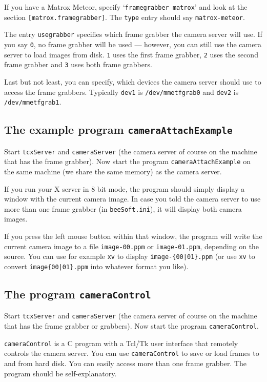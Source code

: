 \documentclass{article}
\begin{document}
If you have a Matrox Meteor, specify `\texttt{framegrabber matrox}' and look
at the section \texttt{[matrox.framegrabber]}. The \texttt{type} entry should
say \texttt{matrox-meteor}.

The entry \texttt{usegrabber} specifies which frame grabber the camera server
will use. If you say \texttt{0}, no frame grabber will be used --- however,
you can still use the camera server to load images from disk. \texttt{1} uses
the first frame grabber, \texttt{2} uses the second frame grabber and
\texttt{3} uses both frame grabbers.

Last but not least, you can specify, which devices the camera server should
use to access the frame grabbers. Typically \texttt{dev1} is
\texttt{/dev/mmetfgrab0} and \texttt{dev2} is \texttt{/dev/mmetfgrab1}.

\subsection{The example program \texttt{cameraAttachExample}}
 
Start \texttt{tcxServer} and \texttt{cameraServer} (the camera server of
course on the machine that has the frame grabber). Now start the program
\texttt{cameraAttachExample} on the same machine (we share the same memory) as
the camera server.

If you run your X server in 8 bit mode, the program should simply display a
window with the current camera image. In case you told the camera server to
use more than one frame grabber (in \texttt{beeSoft.ini}), it will display
both camera images.

If you press the left mouse button within that window, the program will write
the current camera image to a file \texttt{image-00.ppm} or
\texttt{image-01.ppm}, depending on the source. You can use for example
\texttt{xv} to display \texttt{image-\{00|01\}.ppm} (or use \texttt{xv} to
convert \texttt{image\{00|01\}.ppm} into whatever format you like).
 
\subsection{The program \texttt{cameraControl}}
 
Start \texttt{tcxServer} and \texttt{cameraServer} (the camera server of
course on the machine that has the frame grabber or grabbers). Now start the
program \texttt{cameraControl}.

\texttt{cameraControl} is a C program with a Tcl/Tk user interface that
remotely controls the camera server. You can use \texttt{cameraControl} to
save or load frames to and from hard disk. You can easily access more than one
frame grabber. The program should be self-explanatory.
\end{document}
